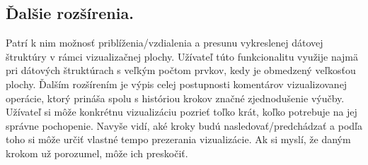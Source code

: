 \subsection{Ďalšie rozšírenia.}
Patrí k nim
možnosť priblíženia/vzdialenia a presunu vykreslenej dátovej štruktúry v rámci
vizualizačnej plochy. Užívateľ túto funkcionalitu využije najmä pri dátových
štruktúrach s veľkým počtom prvkov, kedy je obmedzený veľkosťou plochy. Ďalším
rozšírením je výpis celej postupnosti komentárov vizualizovanej operácie,
ktorý prináša spolu s históriou krokov značné zjednodušenie
výučby. Užívateľ si môže konkrétnu vizualizáciu pozrieť toľko krát, koľko
potrebuje na jej správne pochopenie. Navyše vidí, aké kroky budú
nasledovať/predchádzať a podľa toho si môže určiť vlastné tempo prezerania
vizualizácie. Ak si myslí, že daným krokom už porozumel, môže ich preskočiť.

